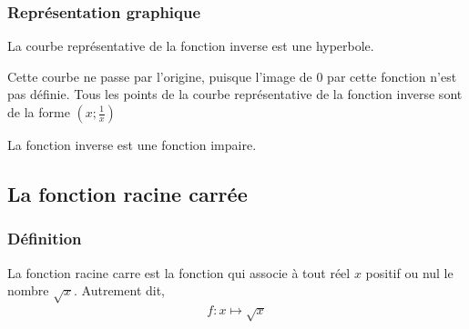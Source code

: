 \documentclass[11pt]{article}
\begin{document}
\subsubsection{Représentation graphique}
\label{sec:org0eb29b4}

\begin{center}
\end{center}

 \begin{prop}
  La courbe représentative de la fonction inverse est une hyperbole.

  Cette courbe ne passe par l'origine, puisque l'image de $0$ par cette fonction n'est pas définie.
  Tous les points de la courbe représentative de la fonction inverse sont de la forme
  $(x; \frac{1}{x})$

  La fonction inverse est une fonction impaire.
\end{prop}
\subsection{La fonction racine carrée}
\label{sec:org559ffac}
\subsubsection{Définition}
\label{sec:orgaf2d20a}
\begin{defi}
  La fonction racine carre est la fonction qui associe à tout réel $x$ positif
  ou nul le nombre $\sqrt{x}$. Autrement dit,
  \begin{align*}
    f : x \mapsto \sqrt{x}
  \end{align*}
\end{defi}
\end{document}
